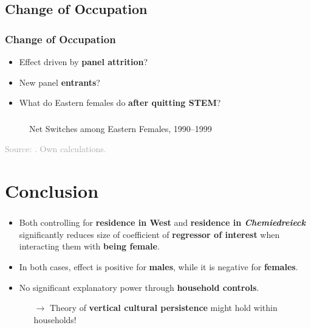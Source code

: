 \documentclass[11pt, aspectratio=1610, xcolor={dvipsnames}]{beamer}
\newcommand{\highlight}[1]{\textbf{\textcolor{PineGreen}{#1}}}
\begin{document}
	\subsection{Change of Occupation}
	\begin{frame}
		\frametitle{Change of Occupation}
		
		\begin{itemize}
			\item Effect driven by \highlight{panel attrition}?
			\item New panel \highlight{entrants}?
			\item What do Eastern females do \highlight{after quitting STEM}?
		\end{itemize}
		
	\end{frame}

	\begin{frame}
		\frametitle{}
		
		\begin{figure}[h]
			\centering
			\caption{Net Switches among Eastern Females, 1990--1999}
			\label{fig:eastern_female_tracking}
			\resizebox{75mm}{!}{}
		\end{figure}
		
		{\scriptsize
			\textcolor{darkgray}{Source: \cite{SOEP2023}. Own calculations.}
		}
		
	\end{frame}
		
	\section{Conclusion}	
	\begin{frame}
		\frametitle{}
		
		\begin{itemize}
			\item Both controlling for \highlight{residence in West} and \highlight{residence in \emph{Chemiedreieck}} significantly reduces size of coefficient of \highlight{regressor of interest} when interacting them with \highlight{being female}.
			\item In both cases, effect is positive for \highlight{males}, while it is negative for \highlight{females}.
			\item No significant explanatory power through \highlight{household controls}.
			\begin{itemize}
				\item[$\rightarrow$] Theory of \highlight{vertical cultural persistence} might hold within households!
			\end{itemize}
		\end{itemize}
		
	\end{frame}
	
\end{document}

